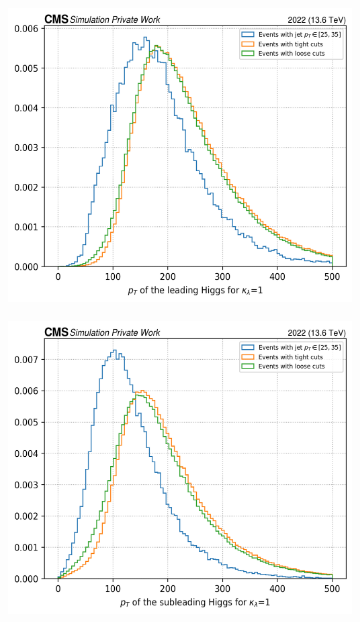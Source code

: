 \begin{figure}[h!]
    \centering
    \begin{subfigure}[b]{0.4\textwidth}
        \centering
        \includegraphics[width=\textwidth]{Images/4.HH4b Analysis/New events/pt h1.png}
        \label{fig: pt h1}
    \end{subfigure}
    \hfill
    \begin{subfigure}[b]{0.4\textwidth}
        \centering
        \includegraphics[width=\textwidth]{Images/4.HH4b Analysis/New events/pt h2.png}
        \label{fig: pt h2}
    \end{subfigure}


\end{figure}
